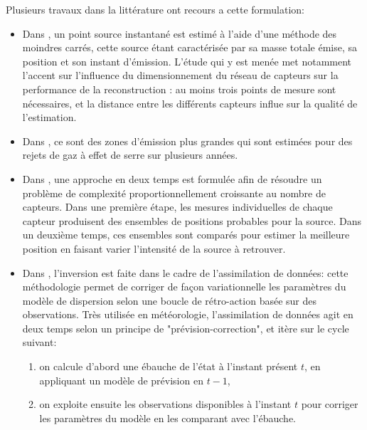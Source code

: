 Plusieurs travaux dans la littérature ont recours a cette formulation: \\
\begin{itemize}
	\item Dans \cite{Kathirgamanathan2002}, un point source instantané est estimé à l'aide d'une méthode des moindres carrés, cette source étant caractérisée par sa masse totale émise, sa position et son instant d'émission. L'étude qui y est menée met notamment l'accent sur l'influence du dimensionnement du réseau de capteurs sur la performance de la reconstruction : au moins trois points de mesure sont nécessaires, et la distance entre les différents capteurs influe sur la qualité de l'estimation.\\
	
	\item Dans \cite{Ryall2001}, ce sont des zones d'émission plus grandes qui sont estimées pour des rejets de gaz à effet de serre sur plusieurs années. \\
	
	\item Dans \cite{Matthes2005}, une approche en deux temps est formulée afin de résoudre un problème de complexité proportionnellement croissante au nombre de capteurs. Dans une première étape, les mesures individuelles de chaque capteur produisent des ensembles de positions probables pour la source. Dans un deuxième temps, ces ensembles sont comparés pour estimer la meilleure position en faisant varier l'intensité de la source à retrouver. \\
	
	\item  Dans \cite{Robertson1998}, l'inversion est faite dans le cadre de l'assimilation de données: cette méthodologie permet de corriger de façon variationnelle les paramètres du modèle de dispersion selon une boucle de rétro-action basée sur des observations. Très utilisée en météorologie, l'assimilation de données agit en deux temps selon un principe de "prévision-correction", et itère sur le cycle suivant:
	\begin{enumerate}
		\item  on calcule d'abord une ébauche de l'état à l'instant présent $t$, en appliquant un modèle de prévision en $t-1$,
		\item  on exploite ensuite les observations disponibles à l'instant $t$ pour corriger les paramètres du modèle en les comparant avec l'ébauche. \\
	\end{enumerate}
	

\end{itemize}
